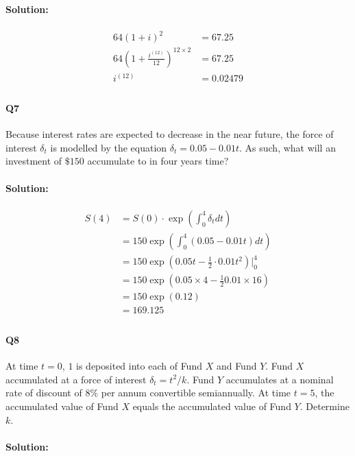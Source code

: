 \documentclass[a4paper, 11pt, twoside]{article}
\begin{document}
\paragraph{Solution:} 

\[
\begin{split}
	64(1+i)^2 &= 67.25 \\
	64(1+\frac{i^{(12)}}{12})^{12\times 2} &= 67.25\\
	i^{(12)}&=0.02479\\
\end{split}
\]

\paragraph{Q7} Because interest rates are expected to decrease in the near future, the force of interest $\delta_t$ is modelled by the equation $\delta_t=0.05-0.01t.$ As such, what will an investment of $\$150$ accumulate to in four years time?\\

\paragraph{Solution:}

\[
\begin{split}
	S(4) &= S(0)\cdot \exp\left(\int^4_0\delta_t dt\right)\\
	&= 150\exp\left(\int^4_0(0.05-0.01t)dt\right)\\
	&=150\exp\left(0.05t-\frac12\cdot0.01t^2\right)\bigg\vert^4_0\\
	&=150\exp\left(0.05\times 4-\frac12 0.01\times 16\right)\\
	&=150\exp(0.12)\\
	&=169.125\\
\end{split}
\]

\paragraph{Q8} At time $t=0$, $1$ is deposited into each of Fund $X$ and Fund $Y$. Fund $X$ accumulated at a force of interest $\delta_t=t^2/k$. Fund $Y$ accumulates at a nominal rate of discount of $8\%$ per annum convertible semiannually. At time $t=5$, the accumulated value of Fund $X$ equals the accumulated value of Fund $Y$. Determine $k$.\\

\paragraph{Solution:}
\end{document}
